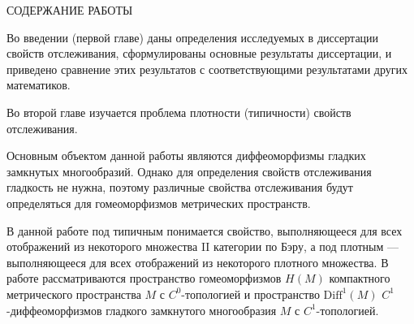 \documentclass[12pt]{article}
\begin{document}
{\medskip
\begin{center}
СОДЕРЖАНИЕ РАБОТЫ
\end{center}
\medskip

Во введении (первой главе) даны определения исследуемых в дис\-сер\-тации свойств отслеживания, сформулированы основные результаты дис\-сер\-тации, и приведено сравнение этих результатов с соответствующими результатами других математиков. 

Во второй главе изучается проблема плотности (типичности) свойств отслеживания.

Основным объектом данной работы являются диффеоморфиз\-мы глад\-ких замкнутых многообразий. Однако для определения свойств от\-сле\-жи\-вания гладкость не нужна, поэтому различные свойства отслеживания будут определяться для гомеоморфизмов метрических пространств. 

В данной работе под типичным понимается свойство, выполняющееся для всех отображений из некоторого множества II категории по Бэру, а под плотным --- выполняющееся для всех отображений из некоторого плотного множества. В работе рассматриваются пространство гомеомор\-физ\-мов $H(M)$ ком\-пактного метрического пространства $M$ с $C^0$-топологи\-ей %
и пространство $\mbox{Diff}^1(M)$ $C^1$-диффеоморфизмов гладкого замкнутого многообразия $M$ с $C^1$-топологией.

}
\end{document}
